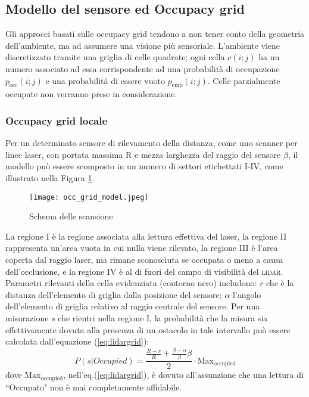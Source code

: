\subsection{Modello del sensore ed Occupacy grid}
\label{sec:occupacygrid}
Gli approcci basati sulle occupacy grid tendono a non tener conto della
geometria dell'ambiente, ma ad assumere una visione più sensoriale.
L'ambiente viene discretizzato tramite una griglia di celle quadrate; ogni
cella $c(i; j)$ ha un numero associato ad essa corrispondente ad una probabilità
di occupazione $p_{\text{occ}}(i; j)$ e una probabilità di essere
vuoto $p_{\text{emp}}(i;j)$.
Celle parzialmente occupate non verranno prese in considerazione.

\subsubsection{Occupacy grid locale}
\label{ssec:localoccgrid}
Per un determinato sensore di rilevamento della distanza, come uno scanner per
linee laser, con portata massima R e mezza larghezza del raggio del sensore
$\beta$, il modello può essere scomposto in un numero di settori etichettati
I-IV\cite{ardhaoui2011implementation}, come illustrato nella Figura \ref{fig:scan scheme}.
%
\begin{figure}[htb]
  \texttt{[image: occ\_grid\_model.jpeg]}
  \caption{Schema delle scansione}
  \label{fig:scan scheme}
\end{figure}

\noindent La regione I è la regione associata alla lettura effettiva del laser,
la regione II rappresenta un'area vuota in cui nulla viene rilevato, la
regione III è l'area coperta dal raggio laser, ma rimane sconosciuta se occupata
o meno a causa dell'occlusione, e la regione IV è al di fuori del campo di
visibilità del \textsc{lidar}.
Parametri rilevanti della cella evidenziata (contorno nero) includono: $r$ che
è la distanza dell'elemento di griglia dalla posizione del sensore;
$\alpha$ l'angolo dell'elemento di griglia relativo al raggio centrale del
sensore.
Per una misurazione $s$ che rientri nella regione I, la probabilità che la
misura sia effettivamente dovuta alla presenza di  un ostacolo in tale
intervallo può essere calcolata dall'equazione (\ref{eq:lidargrid}):
%
\begin{equation}
\label{eq:lidargrid}
P(s|Occupied) = \frac{\frac{R-r}{R} + \frac{ \beta- \alpha}{\beta} \beta}{2}
\cdot \text{Max}_{\text{occupied}}
\end{equation}
%
dove $\text{Max}_{\text{occupied}}$, nell'eq.(\ref{eq:lidargrid}), è dovuto
all'assunzione che una lettura di ``Occupato" non è mai completamente
affidabile.
%
